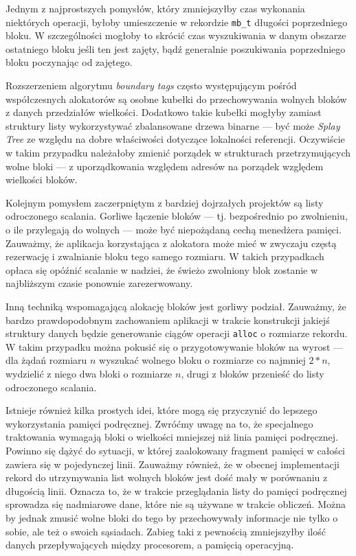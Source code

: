 \documentclass[12pt,a4paper,titlepage,twoside]{mwart}
\begin{document}
Jednym z najprostszych pomysłów, który zmniejszyłby czas wykonania niektórych
operacji, byłoby umieszczenie w rekordzie \verb+mb_t+ długości poprzedniego
bloku. W szczególności mogłoby to skrócić czas wyszukiwania w danym obszarze
ostatniego bloku jeśli ten jest zajęty, bądź generalnie poszukiwania
poprzedniego bloku poczynając od zajętego.

Rozszerzeniem algorytmu \textit{boundary tags} często występującym pośród
współczesnych alokatorów są osobne kubełki do przechowywania wolnych bloków z
danych przedziałów wielkości. Dodatkowo takie kubełki mogłyby zamiast struktury
listy wykorzystywać zbalansowane drzewa binarne --- być może \textit{Splay
Tree} ze względu na dobre właściwości dotyczące lokalności referencji.
Oczywiście w takim przypadku należałoby zmienić porządek w strukturach
przetrzymujących wolne bloki --- z uporządkowania względem adresów na
porządek względem wielkości bloków.

Kolejnym pomysłem zaczerpniętym z bardziej dojrzałych projektów są listy
odroczonego scalania. Gorliwe łączenie bloków --- tj. bezpośrednio po
zwolnieniu, o ile przylegają do wolnych --- może być niepożądaną cechą
menedżera pamięci. Zauważmy, że aplikacja korzystająca z alokatora może mieć w
zwyczaju częstą rezerwację i zwalnianie bloku tego samego rozmiaru. W takich
przypadkach opłaca się opóźnić scalanie w nadziei, że świeżo zwolniony blok
zostanie w najbliższym czasie ponownie zarezerwowany.

Inną techniką wspomagającą alokację bloków jest gorliwy podział. Zauważmy, że
bardzo prawdopodobnym zachowaniem aplikacji w trakcie konstrukcji jakiejś
struktury danych będzie generowanie ciągów operacji \verb+alloc+ o rozmiarze
rekordu. W takim przypadku można pokusić się o przygotowywanie bloków na wyrost
--- dla żądań rozmiaru $n$ wyszukać wolnego bloku o rozmiarze co najmniej
$2*n$, wydzielić z niego dwa bloki o rozmiarze $n$, drugi z bloków przenieść do
listy odroczonego scalania.

Istnieje również kilka prostych idei, które mogą się przyczynić do lepszego
wykorzystania pamięci podręcznej. Zwróćmy uwagę na to, że specjalnego
traktowania wymagają bloki o wielkości mniejszej niż linia pamięci podręcznej.
Powinno się dążyć do sytuacji, w której zaalokowany fragment pamięci w całości
zawiera się w pojedynczej linii.  Zauważmy również, że w obecnej implementacji
rekord do utrzymywania list wolnych bloków jest dość mały w porównaniu z
długością linii.  Oznacza to, że w trakcie przeglądania listy do pamięci
podręcznej sprowadza się nadmiarowe dane, które nie są używane w trakcie
obliczeń. Można by jednak zmusić wolne bloki do tego by przechowywały
informacje nie tylko o sobie, ale też o swoich sąsiadach. Zabieg taki z
pewnością zmniejszyłby ilość danych przepływających między procesorem, a
pamięcią operacyjną.
\end{document}
